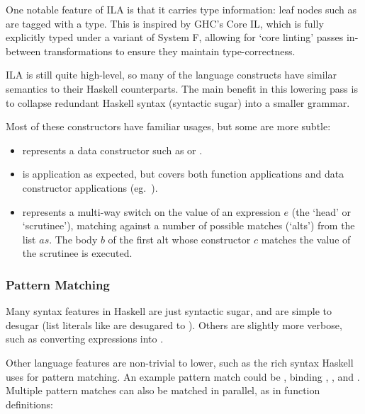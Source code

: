 \documentclass[dissertation.tex]{subfiles}
\begin{document}
{{{            One notable feature of ILA is that it carries type information: leaf nodes such as  are tagged with a type. This is inspired by GHC's Core IL, which is fully explicitly typed under a variant of System F, allowing for `core linting' passes in-between transformations to ensure they maintain type-correctness.

            ILA is still quite high-level, so many of the language constructs have similar semantics to their Haskell counterparts. The main benefit in this lowering pass is to collapse redundant Haskell syntax (syntactic sugar) into a smaller grammar.

            Most of these constructors have familiar usages, but some are more subtle:

            \begin{itemize}
            \item {} represents a data constructor such as  or .
            \item
            {
                 is application as expected, but covers both function applications and data constructor applications (eg.\ ).
            }
            \item
            {
                 represents a multi-way switch on the value of an expression \(e\) (the `head' or `scrutinee'), matching against a number of possible matches (`alts') from the list \(as\). The body \(b\) of the first alt  whose constructor \(c\) matches the value of the scrutinee is executed.
            }
            \end{itemize}
        }
        \subsubsection{Pattern Matching}
        {
            Many syntax features in Haskell are just syntactic sugar, and are simple to desugar (list literals like \haskell{[1, 2]} are desugared to ). Others are slightly more verbose, such as converting  expressions into .

            Other language features are non-trivial to lower, such as the rich syntax Haskell uses for pattern matching. An example pattern match could be , binding , , and . Multiple pattern matches can also be matched in parallel, as in function definitions:

}}}
\end{document}
